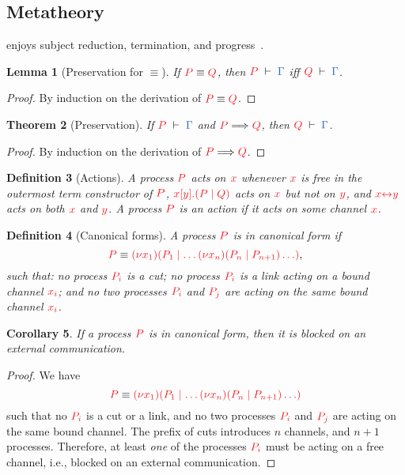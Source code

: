 \documentclass[submission,copyright,creativecommons]{eptcs}
\newtheorem{lemma}{Lemma}[section]
\newtheorem{theorem}[lemma]{Theorem}
\newtheorem{corollary}[lemma]{Corollary}
\newtheorem{definition}[lemma]{Definition}
\begin{document}
\subsection{Metatheory}
\cp enjoys subject reduction, termination, and progress~\cite{wadler2012}.
\begin{lemma}[Preservation for $\equiv$]\label{lem:cp-preservation-equiv}
  If $\tm{P}\equiv\tm{Q}$, then $\seq[P]{\Gamma}$ iff $\seq[Q]{\Gamma}$.
\end{lemma} 
\begin{proof}
  By induction on the derivation of $\tm{P}\equiv\tm{Q}$.
\end{proof}
\begin{theorem}[Preservation]\label{thm:cp-preservation}
  If $\seq[P]{\Gamma}$ and $\reducesto{P}{Q}$, then $\seq[Q]{\Gamma}$.
\end{theorem} 
\begin{proof}
  By induction on the derivation of $\reducesto{P}{Q}$.
\end{proof}
\begin{definition}[Actions]
  A process $\tm{P}$ acts on $\tm{x}$ whenever $\tm{x}$ is free in the outermost
  term constructor of $\tm{P}$, \eg $\tm{\cpSend{x}{y}{P}{Q}}$ acts on $\tm{x}$
  but not on $\tm{y}$, and $\tm{\cpLink{x}{y}}$ acts on both $\tm{x}$ and $\tm{y}$.
  A process $\tm{P}$ is an action if it acts on some channel $\tm{x}$.
\end{definition}
\begin{definition}[Canonical forms]
  A process $\tm{P}$ is in canonical form if
  \[
    \tm{P} \equiv \tm{\cpCut{x_1}{P_1}{\dots\cpCut{x_n}{P_n}{P_{n+1}}\dots}},
  \]
  such that: no process $\tm{P_i}$ is a cut; no process $\tm{P_i}$ is a link acting on a bound channel $\tm{x_i}$; and no two processes $\tm{P_i}$ and $\tm{P_j}$ are acting on the same bound channel $\tm{x_i}$.
\end{definition}
\begin{corollary}
  If a process $\tm{P}$ is in canonical form, then it is blocked on an external communication.
\end{corollary}
\begin{proof}
  We have
  \[
  \tm{P} \equiv \tm{\cpCut{x_1}{P_1}{\dots\cpCut{x_n}{P_n}{P_{n+1}}\dots}}
  \]
  such that no $\tm{P_i}$ is a cut or a link, and no two processes $\tm{P_i}$ and $\tm{P_j}$ are acting on the same bound channel. The prefix of cuts introduces $n$ channels, and $n+1$ processes. Therefore, at least \emph{one} of the processes $\tm{P_i}$ must be acting on a free channel, i.e., blocked on an external communication.
\end{proof}
\end{document}
